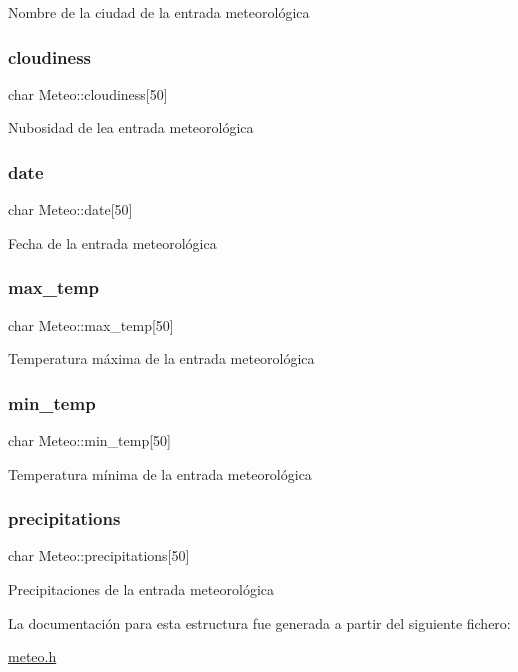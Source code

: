 Nombre de la ciudad de la entrada meteorológica \mbox{\label{struct_meteo_a2409c68ef046a6d4e38aeb98b6495a74}} 
\subsubsection{\texorpdfstring{cloudiness}{cloudiness}}
{\footnotesize\ttfamily char Meteo\+::cloudiness\mbox{[}50\mbox{]}}

Nubosidad de lea entrada meteorológica \mbox{\label{struct_meteo_a1354ca60b1c8eace8abf4ba566136b8b}} 
\subsubsection{\texorpdfstring{date}{date}}
{\footnotesize\ttfamily char Meteo\+::date\mbox{[}50\mbox{]}}

Fecha de la entrada meteorológica \mbox{\label{struct_meteo_aad4188ec453f95ee437ad25a84e16d56}} 
\subsubsection{\texorpdfstring{max\+\_\+temp}{max\_temp}}
{\footnotesize\ttfamily char Meteo\+::max\+\_\+temp\mbox{[}50\mbox{]}}

Temperatura máxima de la entrada meteorológica \mbox{\label{struct_meteo_a1a257a09d4d66da1165856855f2893e3}} 
\subsubsection{\texorpdfstring{min\+\_\+temp}{min\_temp}}
{\footnotesize\ttfamily char Meteo\+::min\+\_\+temp\mbox{[}50\mbox{]}}

Temperatura mínima de la entrada meteorológica \mbox{\label{struct_meteo_ae643bf6c0308de92be1d5500d582cba4}} 
\subsubsection{\texorpdfstring{precipitations}{precipitations}}
{\footnotesize\ttfamily char Meteo\+::precipitations\mbox{[}50\mbox{]}}

Precipitaciones de la entrada meteorológica 

La documentación para esta estructura fue generada a partir del siguiente fichero\+:\begin{DoxyCompactItemize}
\item 
\hyperlink{meteo_8h}{meteo.\+h}\end{DoxyCompactItemize}
